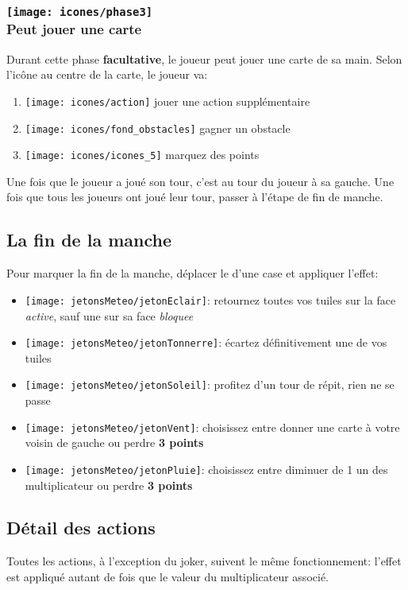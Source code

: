 \subsubsection*{\texttt{[image: icones/phase3]} \\ Peut jouer une carte}
Durant cette phase \textbf{facultative}, le joueur peut jouer une carte de sa main. Selon l'icône au centre de la carte, le joueur va:
\begin{enumerate}
\item \texttt{[image: icones/action]} jouer une action supplémentaire
\item \texttt{[image: icones/fond\_obstacles]} gagner un obstacle
\item \texttt{[image: icones/icones\_5]} marquez des points
\end{enumerate}

Une fois que le joueur a joué son tour, c'est au tour du joueur à sa gauche. Une fois que tous les joueurs ont joué leur tour, passer à l'étape de fin de manche.

\subsection*{La fin de la manche} \label{sec:finDeManche}
Pour marquer la fin de la manche, déplacer le \compteurManche d'une case et appliquer l'effet:
\begin{itemize}
\item \texttt{[image: jetonsMeteo/jetonEclair]}: retournez toutes vos tuiles sur la face \textit{active}, sauf une sur sa face \textit{bloquee}
\item \texttt{[image: jetonsMeteo/jetonTonnerre]}: écartez définitivement une de vos tuiles
\item \texttt{[image: jetonsMeteo/jetonSoleil]}: profitez d'un tour de répit, rien ne se passe
\item \texttt{[image: jetonsMeteo/jetonVent]}: choisissez entre donner une carte à votre voisin de gauche ou perdre \textbf{3 points}
\item \texttt{[image: jetonsMeteo/jetonPluie]}: choisissez entre diminuer de 1 un des multiplicateur ou perdre \textbf{3 points}
\end{itemize}

\subsection*{Détail des actions} \label{sec:actions}
Toutes les actions, à l'exception du joker, suivent le même fonctionnement: l'effet est appliqué autant de fois que le valeur du multiplicateur associé.
